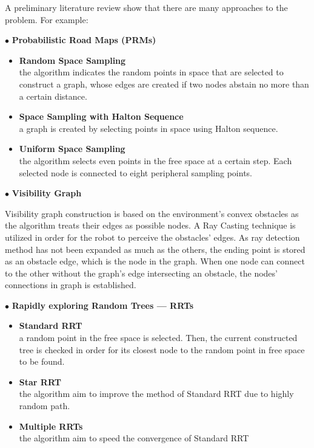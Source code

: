 \hspace{1.27cm}
A preliminary literature review show that there are many approaches to the problem. For example:

$\bullet$ \textbf{Probabilistic Road Maps (PRMs)}

\begin{itemize}
    \item \textbf{Random Space Sampling}\\
    the algorithm indicates the random points in space that are selected to construct a graph, whose edges are created if two nodes abstain no more than a certain distance.\\
    \item \textbf{Space Sampling with Halton Sequence}\\
    a graph is created by selecting points in space using Halton sequence.
    \item \textbf{Uniform Space Sampling}\\
    the algorithm selects even points in the free space at a certain step. Each selected node is connected to eight peripheral sampling points.
\end{itemize}

$\bullet$ \textbf{Visibility Graph}\par
Visibility graph construction is based on the environment's convex obstacles as the algorithm treats their edges as possible nodes. A Ray Casting technique is utilized in order for the robot to perceive the obstacles' edges. As ray detection method has not been expanded as much as the others, the ending point is stored as an obstacle edge, which is the node in the graph. When one node can connect to the other without the graph's edge intersecting an obstacle, the nodes' connections in graph is established.

$\bullet$ \textbf{Rapidly exploring Random Trees — RRTs}
\begin{itemize}
    \item \textbf{Standard RRT}\\
    a random point in the free space is selected. Then, the current constructed tree is checked in order for its closest node to the random point in free space to be found.
    \item \textbf{Star RRT}\\
    the algorithm aim to improve the method of Standard RRT due to highly random path.
    \item \textbf{Multiple RRTs}\\
    the algorithm aim to speed the convergence of Standard RRT
\end{itemize}

